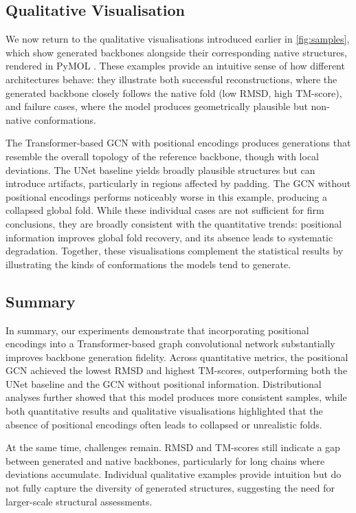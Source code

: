 \documentclass[a4paper,12pt]{article}
\begin{document}
\subsection{Qualitative Visualisation}\label{subsec:visualisation}
We now return to the qualitative visualisations introduced earlier in \cref{fig:samples}, which show generated backbones alongside their corresponding native structures, rendered in PyMOL \citep{PyMOL,JyMOL,AxPyMOL}. These examples provide an intuitive sense of how different architectures behave: they illustrate both successful reconstructions, where the generated backbone closely follows the native fold (low RMSD, high TM-score), and failure cases, where the model produces geometrically plausible but non-native conformations.

The Transformer-based GCN with positional encodings produces generations that resemble the overall topology of the reference backbone, though with local deviations. The UNet baseline yields broadly plausible structures but can introduce artifacts, particularly in regions affected by padding. The GCN without positional encodings performs noticeably worse in this example, producing a collapsed global fold. While these individual cases are not sufficient for firm conclusions, they are broadly consistent with the quantitative trends: positional information improves global fold recovery, and its absence leads to systematic degradation. Together, these visualisations complement the statistical results by illustrating the kinds of conformations the models tend to generate.

\subsection{Summary}\label{subsec:experiments-summary}
In summary, our experiments demonstrate that incorporating positional encodings into a Transformer-based graph convolutional network substantially improves backbone generation fidelity. Across quantitative metrics, the positional GCN achieved the lowest RMSD and highest TM-scores, outperforming both the UNet baseline and the GCN without positional information. Distributional analyses further showed that this model produces more consistent samples, while both quantitative results and qualitative visualisations highlighted that the absence of positional encodings often leads to collapsed or unrealistic folds.

At the same time, challenges remain. RMSD and TM-scores still indicate a gap between generated and native backbones, particularly for long chains where deviations accumulate. Individual qualitative examples provide intuition but do not fully capture the diversity of generated structures, suggesting the need for larger-scale structural assessments.
\end{document}
